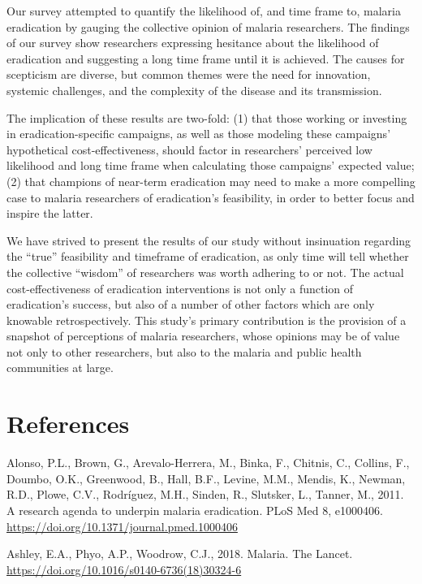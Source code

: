 \documentclass[]{article}
\begin{document}
Our survey attempted to quantify the likelihood of, and time frame to,
malaria eradication by gauging the collective opinion of malaria
researchers. The findings of our survey show researchers expressing
hesitance about the likelihood of eradication and suggesting a long time
frame until it is achieved. The causes for scepticism are diverse, but
common themes were the need for innovation, systemic challenges, and the
complexity of the disease and its transmission.

The implication of these results are two-fold: (1) that those working or
investing in eradication-specific campaigns, as well as those modeling
these campaigns' hypothetical cost-effectiveness, should factor in
researchers' perceived low likelihood and long time frame when
calculating those campaigns' expected value; (2) that champions of
near-term eradication may need to make a more compelling case to malaria
researchers of eradication's feasibility, in order to better focus and
inspire the latter.

We have strived to present the results of our study without insinuation
regarding the ``true'' feasibility and timeframe of eradication, as only
time will tell whether the collective ``wisdom'' of researchers was
worth adhering to or not. The actual cost-effectiveness of eradication
interventions is not only a function of eradication's success, but also
of a number of other factors which are only knowable retrospectively.
This study's primary contribution is the provision of a snapshot of
perceptions of malaria researchers, whose opinions may be of value not
only to other researchers, but also to the malaria and public health
communities at large.

\section*{References}\label{references}

\hypertarget{refs}{}
\hypertarget{ref-Alonso2011}{}
Alonso, P.L., Brown, G., Arevalo-Herrera, M., Binka, F., Chitnis, C.,
Collins, F., Doumbo, O.K., Greenwood, B., Hall, B.F., Levine, M.M.,
Mendis, K., Newman, R.D., Plowe, C.V., Rodríguez, M.H., Sinden, R.,
Slutsker, L., Tanner, M., 2011. A research agenda to underpin malaria
eradication. PLoS Med 8, e1000406.
\url{https://doi.org/10.1371/journal.pmed.1000406}

\hypertarget{ref-Ashley2018}{}
Ashley, E.A., Phyo, A.P., Woodrow, C.J., 2018. Malaria. The Lancet.
\url{https://doi.org/10.1016/s0140-6736(18)30324-6}
\end{document}
